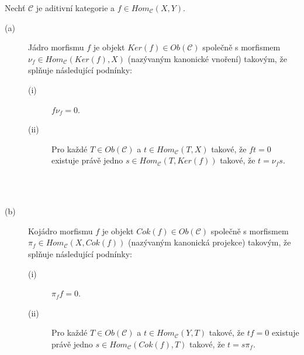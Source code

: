     \begin{dfn}
      Nechť $\mathcal C$ je aditivní kategorie a $f\in Hom_{\mathcal C}(X,Y)$.
      \begin{description}
        \item[(a)] Jádro morfismu $f$ je objekt $Ker(f)\in Ob(\mathcal C)$ 
          společně s morfismem $\nu_f\in Hom_{\mathcal C}(Ker(f),X)$ 
          (nazývaným kanonické vnoření) takovým, že 
          splňuje následující podnínky:
          \begin{description}
            \item[(i)] $f\nu_f=0$.
            \item[(ii)] Pro každé $T\in Ob(\mathcal C)$ a $t\in Hom_{\mathcal C}(T,X)$ 
            takové, že $ft=0$ existuje právě jedno $s\in Hom_{\mathcal C}(T,Ker(f))$ 
            takové, že $t=\nu_f s$. \\\\
            \centerline{}\\
          \end{description}
        \item[(b)] Kojádro morfismu $f$ je objekt $Cok(f)\in Ob(\mathcal C)$ 
          společně s morfismem $\pi_f\in Hom_{\mathcal C}(X,Cok(f))$
          (nazývaným kanonická projekce) takovým, že 
          splňuje následující podnínky:
          \begin{description}
            \item[(i)] $\pi_ff=0$.
            \item[(ii)] Pro každé $T\in Ob(\mathcal C)$ a $t\in Hom_{\mathcal C}(Y,T)$ 
            takové, že $tf=0$ existuje právě jedno $s\in Hom_{\mathcal C}(Cok(f),T)$ 
            takové, že $t=s\pi_f $. \\\\
            \centerline{}\\
          \end{description}
      \end{description}
    \end{dfn}
      
